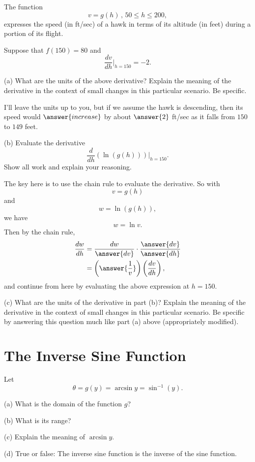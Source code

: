 \documentclass{ximera}
\begin{document}
\begin{question}   \label{Qdfdfnnn}
The function
\[
    v =g(h) \, , \, 50\leq h \leq 200 , 
\]
expresses the speed (in ft/sec) of a hawk in terms of its altitude (in feet) during a portion of its flight.

Suppose that $f(150) = 80$ and
\[
     \frac{dv}{dh}\Big|_{h=150} = -2 .
\]

(a) What are the units of the above derivative? Explain the meaning of the derivative in the context of small changes in this particular scenario. Be specific.

I'll leave the units up to you, but if we assume the hawk is descending, then its speed would $\answer{increase}$ by about $\answer{2}$ ft/sec as it falls from $150$ to $149$ feet.

(b) Evaluate the derivative
\[
    \frac{d}{dh} \left( \ln (g(h))\right)\Big|_{h=150}.
\]
Show all work and explain your reasoning.

The key here is to use the chain rule to evaluate the derivative. So with
\[
   v = g(h)
\]
and 
\[
    w = \ln (g(h)),
\]
we have
\[
    w  = \ln v .
\]
Then by the chain rule,
\begin{align*}
     \frac{dw}{dh} &= \frac{dw}{\answer{dv}} \cdot \frac{\answer{dv}}{\answer{dh}} \\
                          &= \left( \answer{\frac{1}{v}} \right) \left( \frac{dv}{dh}  \right),
\end{align*}
and continue from here by evaluating the above expression at $h=150$.

(c) What are the units of the derivative in part (b)? Explain the meaning of the derivative in the context of small changes in this particular scenario. Be specific by answering this question much like part (a) above (appropriately modified).



\end{question}


\section*{The Inverse Sine Function}
Let
\[
  \theta = g(y) = \arcsin y = \sin^{-1}(y).
\]

(a) What is the domain of the function $g$?

(b) What is its range?

(c) Explain the meaning of $\arcsin y$.

(d) True or false: The inverse sine function is the inverse of the sine function.
\end{document}
